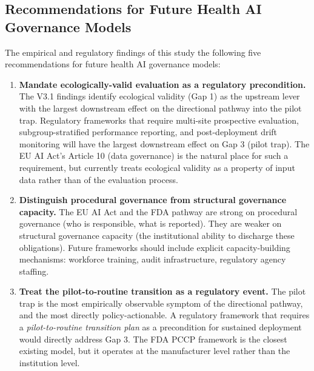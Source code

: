\subsection{Recommendations for Future Health AI Governance Models}
\label{sec:recommendations}

The empirical and regulatory findings of this study
 the following five recommendations for future
health AI governance models:

\begin{enumerate}
  \item \textbf{Mandate ecologically-valid evaluation as a
        regulatory precondition.} The V3.1 findings identify
        ecological validity (Gap 1) as the upstream lever
        with the largest downstream effect on the directional
        pathway into the pilot trap. Regulatory frameworks that
        require multi-site prospective evaluation,
        subgroup-stratified performance reporting, and
        post-deployment drift monitoring will have the
        largest downstream effect on Gap 3 (pilot trap).
        The EU AI Act's Article 10 (data governance) is
        the natural place for such a requirement, but
        currently treats ecological validity as a
        property of input data rather than of the
        evaluation process.

  \item \textbf{Distinguish procedural governance from
        structural governance capacity.} The EU AI Act
        and the FDA pathway are strong on procedural
        governance (who is responsible, what is
        reported). They are weaker on structural
        governance capacity (the institutional ability
        to discharge these obligations). Future
        frameworks should include explicit
        capacity-building mechanisms: workforce
        training, audit infrastructure, regulatory
        agency staffing.

  \item \textbf{Treat the pilot-to-routine transition as
        a regulatory event.} The pilot trap is the most
        empirically observable symptom of the directional pathway,
        and the most directly policy-actionable. A
        regulatory framework that requires a
        \textit{pilot-to-routine transition plan} as
        a precondition for sustained deployment would
        directly address Gap 3. The FDA PCCP framework
        is the closest existing model, but it operates
        at the manufacturer level rather than the
        institution level.


\end{enumerate}
